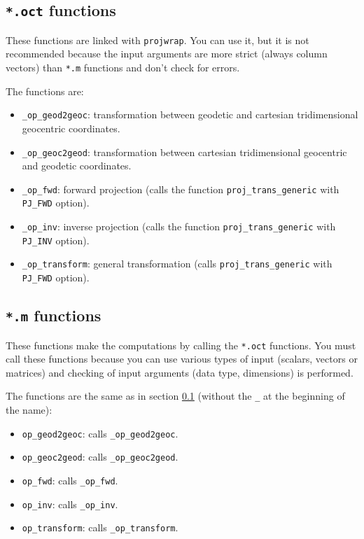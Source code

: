 \documentclass[10pt,a4paper]{article}
\begin{document}
\subsection{\texttt{*.oct} functions}
\label{op-of}

These functions are linked with \texttt{projwrap}. You can use it, but it is not
recommended because the input arguments are more strict (always column vectors)
than \texttt{*.m} functions and don't check for errors.

The functions are:
\begin{itemize}
\item \texttt{\_op\_geod2geoc}: transformation between geodetic and cartesian
      tridimensional geocentric coordinates.
\item \texttt{\_op\_geoc2geod}: transformation between cartesian tridimensional
      geocentric and geodetic coordinates.
\item \texttt{\_op\_fwd}: forward projection (calls the function
      \texttt{proj\_trans\_generic} with \texttt{PJ\_FWD} option).
\item \texttt{\_op\_inv}: inverse projection (calls the function
      \texttt{proj\_trans\_generic} with \texttt{PJ\_INV} option).
\item \texttt{\_op\_transform}: general transformation (calls
      \texttt{proj\_trans\_generic} with \texttt{PJ\_FWD} option).
\end{itemize}

\subsection{\texttt{*.m} functions}

These functions make the computations by calling the \texttt{*.oct} functions.
You must call these functions because you can use various types of input
(scalars, vectors or matrices) and checking of input arguments (data type,
dimensions) is performed.

The functions are the same as in section \ref{op-of} (without the \texttt{\_} at
the beginning of the name):
\begin{itemize}
\item \texttt{op\_geod2geoc}: calls \texttt{\_op\_geod2geoc}.
\item \texttt{op\_geoc2geod}: calls \texttt{\_op\_geoc2geod}.
\item \texttt{op\_fwd}: calls \texttt{\_op\_fwd}.
\item \texttt{op\_inv}: calls \texttt{\_op\_inv}.
\item \texttt{op\_transform}: calls \texttt{\_op\_transform}.
\end{itemize}
\end{document}

